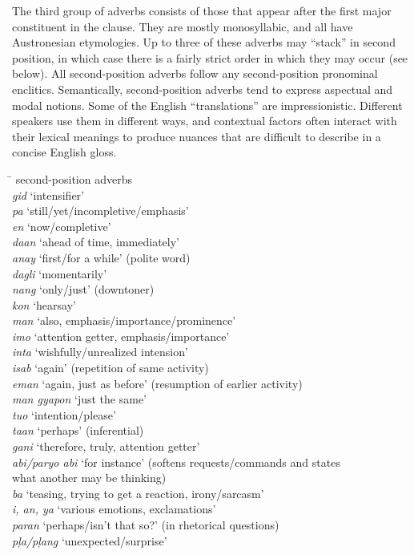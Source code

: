 The third group of adverbs consists of those that appear after the first major constituent in the clause. They are mostly monosyllabic, and all have Austronesian etymologies. Up to three of these adverbs may “stack” in second position, in which case there is a fairly strict order in which they may occur (see  below). All second-position adverbs follow any second-position pronominal enclitics. Semantically, second-position adverbs tend to express aspectual and modal notions. Some of the English “translations” are impressionistic. Different speakers use them in different ways, and contextual factors often interact with their lexical meanings to produce nuances that are difficult to describe in a concise English gloss.

\ea
\label{bkm:Ref113436041}
\begin{tabbing}
\hspace{2.2cm} \= \kill
second-position adverbs \\
\textit{gid} \> ‘intensifier’ \\
\textit{pa} \> ‘still/yet/incompletive/emphasis’ \\
\textit{en} \> ‘now/completive’ \\
\textit{daan} \> ‘ahead of time, immediately’ \\
\textit{anay} \> ‘first/for a while’ (polite word) \\
\textit{dagli} \> ‘momentarily’ \\
\textit{nang} \> ‘only/just’ (downtoner) \\
\textit{kon} \> ‘hearsay’ \\
\textit{man} \> ‘also, emphasis/importance/prominence’ \\
\textit{imo} \> ‘attention getter, emphasis/importance’ \\
\textit{inta} \> ‘wishfully/unrealized intension’ \\
\textit{isab} \> ‘again’ (repetition of same activity) \\
\textit{eman} \> ‘again, just as before’ (resumption of earlier activity) \\
\textit{man gyapon} \> ‘just the same’ \\
\textit{tuo} \> ‘intention/please’ \\
\textit{taan} \> ‘perhaps’ (inferential) \\
\textit{gani} \> ‘therefore, truly, attention getter’ \\
\textit{abi/paryo abi} \> ‘for instance’ (softens requests/commands and states \\
\> what another may be thinking) \\
\textit{ba}\footnotemark{} \> ‘teasing, trying to get a reaction, irony/sarcasm’ \\
\textit{i, an, ya} \> ‘various emotions, exclamations’\footnotemark \\
\textit{paran} \> ‘perhaps/isn’t that so?’ (in rhetorical questions) \\
\textit{pļa/pļang} \> ‘unexpected/surprise’
\end{tabbing}
